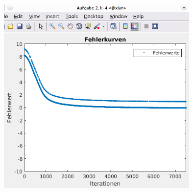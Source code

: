 \documentclass[12pt]{article}
\begin{document}
\begin{center}
\includegraphics[width=10cm]{Bilder/errorplot_aufg2_k4.png}
\end{center}
\end{document}
